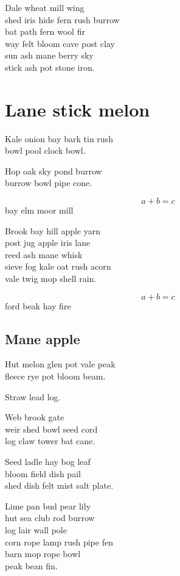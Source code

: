 \documentclass{memoir}
\begin{document}
Dale wheat mill wing \\
shed iris hide fern rush burrow \\
bat path fern wool fir \\
way felt bloom cave post clay \\
sun ash mane berry sky \\
stick ash pot stone iron.

\chapter{Lane stick melon}

Kale onion bay bark tin rush \\
bowl pool clock bowl.

Hop oak sky pond burrow \\
burrow bowl pipe cone.

\begin{equation}
  a + b = c
\end{equation}
bay elm moor mill

Brook bay hill apple yarn \\
post jug apple iris lane \\
reed ash mane whisk \\
sieve fog kale oat rush acorn \\
vale twig mop shell rain.

\begin{equation}
  a + b = c
\end{equation}
ford beak hay fire

\section{Mane apple}

Hut melon glen pot vale peak \\
fleece rye pot bloom beam.

Straw lead log.

Web brook gate \\
weir shed bowl seed cord \\
log claw tower bat cane.

Seed ladle hay bog leaf \\
bloom field dish pail \\
shed dish felt mist salt plate.

Lime pan bud pear lily \\
hut sea club rod burrow \\
log lair wall pole \\
corn rope lamp rush pipe fen \\
barn mop rope bowl \\
peak bean fin.
\end{document}

